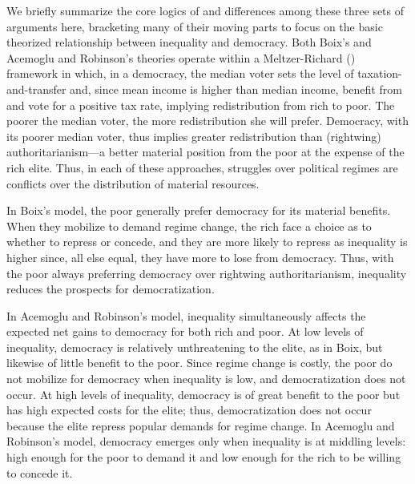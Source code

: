 \documentclass[12pt,]{book}
\begin{document}
We briefly summarize the core logics of and differences among these three sets of arguments here, bracketing many of their moving parts to focus on the basic theorized relationship between inequality and democracy. Both Boix's and Acemoglu and Robinson's theories operate within a Meltzer-Richard (\citet{meltzer1981rational}) framework in which, in a democracy, the median voter sets the level of taxation-and-transfer and, since mean income is higher than median income, benefit from and vote for a positive tax rate, implying redistribution from rich to poor. The poorer the median voter, the more redistribution she will prefer. Democracy, with its poorer median voter, thus implies greater redistribution than (rightwing) authoritarianism---a better material position from the poor at the expense of the rich elite. Thus, in each of these approaches, struggles over political regimes are conflicts over the distribution of material resources.

In Boix's model, the poor generally prefer democracy for its material benefits. When they mobilize to demand regime change, the rich face a choice as to whether to repress or concede, and they are more likely to repress as inequality is higher since, all else equal, they have more to lose from democracy. Thus, with the poor always preferring democracy over rightwing authoritarianism, inequality reduces the prospects for democratization.

In Acemoglu and Robinson's model, inequality simultaneously affects the expected net gains to democracy for both rich and poor. At low levels of inequality, democracy is relatively unthreatening to the elite, as in Boix, but likewise of little benefit to the poor. Since regime change is costly, the poor do not mobilize for democracy when inequality is low, and democratization does not occur. At high levels of inequality, democracy is of great benefit to the poor but has high expected costs for the elite; thus, democratization does not occur because the elite repress popular demands for regime change. In Acemoglu and Robinson's model, democracy emerges only when inequality is at middling levels: high enough for the poor to demand it and low enough for the rich to be willing to concede it.
\end{document}
